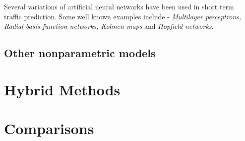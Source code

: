 Several variations of artificial neural networks have been used in short term traffic prediction.
Some well known examples include - \textit{Multilayer perceptrons, Radial basis function
networks, Kohnen maps} and \textit{Hopfield networks}.


\subsection{Other nonparametric models}

\section{Hybrid Methods}


\section{Comparisons}
